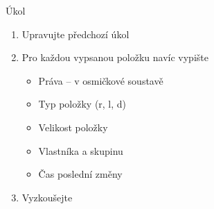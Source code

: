 \begin{frame}{Úkol}

  \begin{enumerate}
    \item Upravujte předchozí úkol
    \item Pro každou vypsanou položku navíc vypište
    \begin{itemize}
      \item Práva -- v osmičkové soustavě
      \item Typ položky (r, l, d)
      \item Velikost položky
      \item Vlastníka a skupinu
      \item Čas poslední změny
    \end{itemize}

    \item Vyzkoušejte
  \end{enumerate}

\end{frame}
